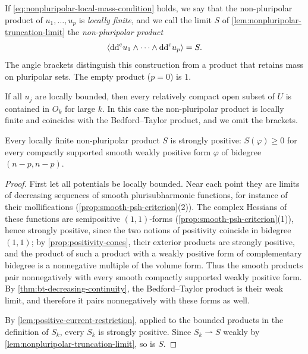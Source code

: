 \begin{definition}\label{def:nonpluripolar-product}
If \eqref{eq:nonpluripolar-local-mass-condition} holds, we say that the non-pluripolar product of $u_1,\ldots,u_p$ is \emph{locally finite}, and we call the limit $S$ of \cref{lem:nonpluripolar-truncation-limit} the \emph{non-pluripolar product}
\[
 \langle\mathrm{dd}^{\mathrm{c}} u_1\wedge\cdots\wedge\mathrm{dd}^{\mathrm{c}} u_p\rangle=S.
\]
The angle brackets distinguish this construction from a product that retains mass on pluripolar sets. The empty product ($p=0$) is $1$.
\end{definition}
If all $u_j$ are locally bounded, then every relatively compact open subset of $U$ is contained in $O_k$ for large $k$. In this case the non-pluripolar product is locally finite and coincides with the Bedford--Taylor product, and we omit the brackets.

\begin{proposition}\label{prop:nonpluripolar-strong-positivity}
Every locally finite non-pluripolar product $S$ is strongly positive: $S(\varphi)\geq0$ for every compactly supported smooth weakly positive form $\varphi$ of bidegree $(n-p,n-p)$.
\end{proposition}
\begin{proof}
First let all potentials be locally bounded. Near each point they are limits of decreasing sequences of smooth plurisubharmonic functions, for instance of their mollifications (\cref{prop:smooth-psh-criterion}(2)). The complex Hessians of these functions are semipositive $(1,1)$-forms (\cref{prop:smooth-psh-criterion}(1)), hence strongly positive, since the two notions of positivity coincide in bidegree $(1,1)$; by \cref{prop:positivity-cones}, their exterior products are strongly positive, and the product of such a product with a weakly positive form of complementary bidegree is a nonnegative multiple of the volume form. Thus the smooth products pair nonnegatively with every smooth compactly supported weakly positive form. By \cref{thm:bt-decreasing-continuity}, the Bedford--Taylor product is their weak limit, and therefore it pairs nonnegatively with these forms as well.

By \cref{lem:positive-current-restriction}, applied to the bounded products in the definition of $S_k$, every $S_k$ is strongly positive. Since $S_k\rightharpoonup S$ weakly by \cref{lem:nonpluripolar-truncation-limit}, so is $S$.
\end{proof}

